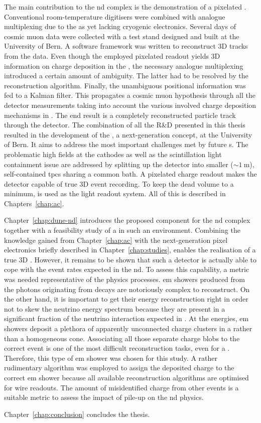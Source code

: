 The main contribution to the \dune{} \gls{nd} complex is the demonstration of a pixelated \lartpc{}.
Conventional room-temperature digitisers were combined with analogue multiplexing due to the as yet lacking cryogenic electronics.
Several days of cosmic muon data were collected with a test stand designed and built at the University of Bern.
A software framework was written to reconstruct 3D tracks from the data.
Even though the employed pixelated readout yields 3D information on charge deposition in the \lartpc{}, the necessary analogue multiplexing introduced a certain amount of ambiguity.
The latter had to be resolved by the reconstruction algorithm.
Finally, the unambiguous positional information was fed to a Kalman filter.
This propagates a cosmic muon hypothesis through all the detector measurements taking into account the various involved charge deposition mechanisms in \lar{}.
The end result is a completely reconstructed particle track through the detector.
The combination of all the R\&D presented in this thesis resulted in the development of the \AC{}, a next-generation \lartpc{} concept, at the University of Bern.
It aims to address the most important challenges met by future \lartpc{}s.
The problematic high fields at the cathodes as well as the scintillation light containment issue are addressed by splitting up the detector into smaller ($\sim{\SI{1}{\metre}}$), self-contained \glspl{tpc} sharing a common \lar{} bath.
A pixelated charge readout makes the detector capable of true 3D event recording.
To keep the dead volume to a minimum, \AL{} is used as the light readout system.
All of this is described in Chapters~\ref{chap:ac}.

Chapter~\ref{chap:dune-nd} introduces the proposed \AC{} \lartpc{} component for the \dune{} \gls{nd} complex together with a feasibility study of a \lartpc{} in such an environment.
Combining the knowledge gained from Chapter~\ref{chap:ac} with the next-generation pixel electronics briefly described in Chapter~\ref{chap:studies}, enables the realisation of a true 3D \lartpc{}.
However, it remains to be shown that such a detector is actually able to cope with the event rates expected in the \gls{nd}.
To assess this capability, a metric was needed representative of the physics processes.
\gls{em} showers produced from the photons originating from \Pgpz decays are notoriously complex to reconstruct.
On the other hand, it is important to get their energy reconstruction right in order not to skew the neutrino energy spectrum because they are present in a significant fraction of the neutrino interaction expected in \dune{}.
At the \dune{} energies, \gls{em} showers deposit a plethora of apparently unconnected charge clusters in a \lartpc{} rather than a homogeneous cone.
Associating all those separate charge blobs to the correct event is one of the most difficult reconstruction tasks, even for a \lartpc{}.
Therefore, this type of \gls{em} shower was chosen for this study.
A rather rudimentary algorithm was employed to assign the deposited charge to the correct \gls{em} shower because all available \lartpc{} reconstruction algorithms are optimised for wire readouts.
The amount of misidentified charge from other events is a suitable metric to assess the impact of pile-up on the \gls{nd} physics.

Chapter~\ref{chap:conclusion} concludes the thesis.
